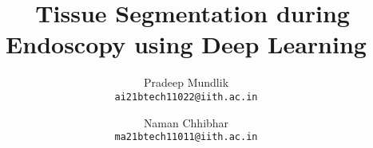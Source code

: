 \documentclass[10pt,twocolumn,letterpaper]{article}
\title{\ Tissue Segmentation during Endoscopy using Deep Learning}
\author{Pradeep Mundlik\\
{\tt\small ai21btech11022@iith.ac.in}
\and
Naman Chhibhar\\
{\tt\small ma21btech11011@iith.ac.in}
}
\begin{document}
\maketitle
    





{
    \small
    \nocite{*}
    
}

% 
\end{document}
